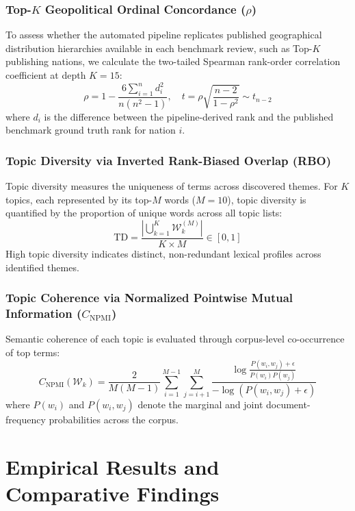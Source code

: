 \documentclass[preprint,12pt]{elsarticle}
\begin{document}
\subsubsection{Top-\texorpdfstring{$K$}{K} Geopolitical Ordinal Concordance (\texorpdfstring{$\rho$}{rho})}
To assess whether the automated pipeline replicates published geographical distribution hierarchies available in each benchmark review, such as Top-$K$ publishing nations, we calculate the two-tailed Spearman rank-order correlation coefficient at depth $K=15$:
\begin{equation}
\rho = 1 - \frac{6 \sum_{i=1}^n d_i^2}{n(n^2 - 1)}, \quad t = \rho \sqrt{\frac{n-2}{1-\rho^2}} \sim t_{n-2}
\end{equation}
where $d_i$ is the difference between the pipeline-derived rank and the published benchmark ground truth rank for nation $i$.

\subsubsection{Topic Diversity via Inverted Rank-Biased Overlap (RBO)}
Topic diversity measures the uniqueness of terms across discovered themes. For $K$ topics, each represented by its top-$M$ words ($M=10$), topic diversity is quantified by the proportion of unique words across all topic lists:
\begin{equation}
\text{TD} = \frac{|\bigcup_{k=1}^K \mathcal{W}_k^{(M)}|}{K \times M} \in [0, 1]
\end{equation}
High topic diversity indicates distinct, non-redundant lexical profiles across identified themes.

\subsubsection{Topic Coherence via Normalized Pointwise Mutual Information (\texorpdfstring{$C_{\text{NPMI}}$}{C\_NPMI})}
Semantic coherence of each topic is evaluated through corpus-level co-occurrence of top terms:
\begin{equation}
C_{\text{NPMI}}(\mathcal{W}_k) = \frac{2}{M(M-1)} \sum_{i=1}^{M-1} \sum_{j=i+1}^M \frac{\log \frac{P(w_i, w_j) + \epsilon}{P(w_i)P(w_j)}}{-\log(P(w_i, w_j) + \epsilon)}
\end{equation}
where $P(w_i)$ and $P(w_i, w_j)$ denote the marginal and joint document-frequency probabilities across the corpus.

\section{Empirical Results and Comparative Findings}
\label{sec:results}
\end{document}
